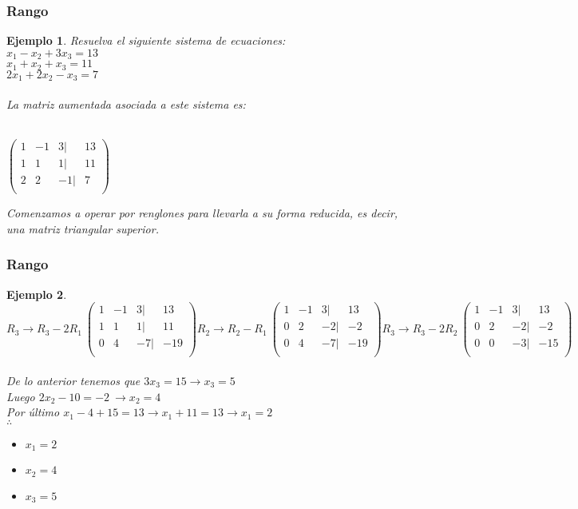 \documentclass[11pt]{beamer}
\newtheorem{ejem}{Ejemplo}
\begin{document}
\begin{frame}
\frametitle{Rango}
\begin{ejem}
Resuelva el siguiente sistema de ecuaciones:\\
$x_1 - x_2 +3x_3 = 13$\\
$x_1 + x_2 + x_3 = 11$\\
$2x_1 + 2x_2 - x_3 = 7$\\ \hspace{0cm} \\
La matriz aumentada asociada a este sistema es: \\ \hspace{0cm} \\
\begin{center}
${\displaystyle \mathbf {} {\begin{pmatrix}1&-1&3|&13\\1&1&1|&11\\2&2&-1|&7\\\end{pmatrix}}}$
\end{center}
Comenzamos a operar por renglones para llevarla a su forma reducida, es decir, una matriz triangular superior.
\end{ejem}
\end{frame}

\begin{frame}
\frametitle{Rango}
\begin{ejem}
$R_3 \rightarrow R_3 - 2R_1 ~ {\displaystyle \mathbf {} {\begin{pmatrix}1&-1&3|&13\\1&1&1|&11\\0&4&-7|&-19\\\end{pmatrix}}}
R_2 \rightarrow R_2 - R_1 ~ {\displaystyle \mathbf {} {\begin{pmatrix}1&-1&3|&13\\0&2&-2|&-2\\0&4&-7|&-19\\\end{pmatrix}}}
R_3 \rightarrow R_3 - 2R_2 ~ {\displaystyle \mathbf {} {\begin{pmatrix}1&-1&3|&13\\0&2&-2|&-2\\0&0&-3|&-15\\\end{pmatrix}}}$
\\ \hspace{0cm} \\
De lo anterior tenemos que $3x_3 = 15 \rightarrow x_3 = 5$\\
Luego $2x_2 -10 = -2 ~ \rightarrow x_2 = 4$\\
Por último $x_1 - 4 + 15 = 13 \rightarrow x_1 + 11 = 13 \rightarrow x_1 = 2$\\
$\therefore$
\begin{itemize}
\item $x_1 = 2$
\item $x_2 = 4$
\item $x_3 = 5$ 
\end{itemize} 
\end{ejem}
\end{frame}
\end{document}

